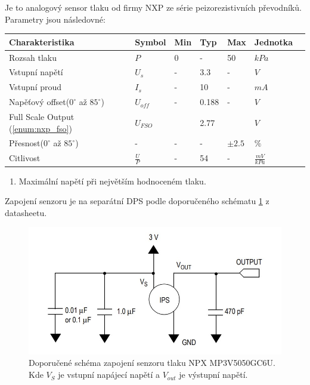 Je to analogový sensor tlaku od firmy NXP ze série peizorezistivních převodníků. Parametry jsou následovné: 
\begin{center}
\begin{tabular}{lllllll}
\toprule
Charakteristika                        & Symbol &  Min  & Typ & Max   & Jednotka &  \\ \midrule
Rozsah tlaku                           & $P$    &  0    &   -   & 50   & $kPa$ & \\
Vstupní napětí                         & $U_{s}$& - & 3.3 &  -  & $V$ &  \\
Vstupní proud                          & $I_{s}$ & - & 10  &  -  & $mA$ &  \\
Napěťový offset($0^{\circ}$ až $ 85^{\circ} $) & $U_{off}$& - & 0.188& -  & $V$ &  \\ 
Full Scale Output (\ref{enum:nxp_fso})                  & $U_{FSO}$ & &2.77& & $V$ & \\
Přesnost($0^{\circ}$ až $ 85^{\circ}$) & - & - & - & $\pm 2.5 $  &  $\%$ &\\
Citlivost                              & $\frac{U}{P}$ & - & 54 & - & $\frac{mV}{kPa}$ & \\
\bottomrule
\end{tabular}

\end{center}
\raggedbottom	
\begin{enumerate}
	\item \label{enum:nxp_fso} Maximální napětí při největším hodnoceném tlaku.
\end{enumerate}
Zapojení senzoru je na separátní DPS podle doporučeného schématu \ref{fig:nxp_recommended} z datasheetu. 


\begin{figure}[H]
    \centering
    \includegraphics{pictures/nxp_recommended.jpg}
    \caption{Doporučené schéma zapojení senzoru tlaku NPX MP3V5050GC6U. Kde $V_S$ je vstupní napájecí napětí a $V_{out}$ je výstupní napětí.}
    \label{fig:nxp_recommended}
\end{figure}

